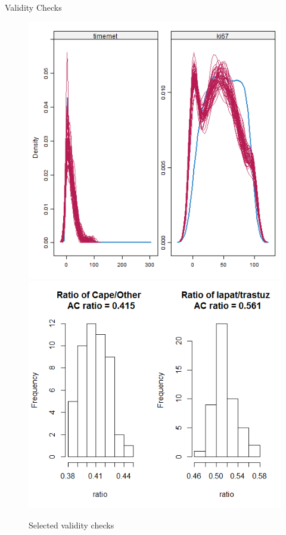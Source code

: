 \begin{frame}{Validity Checks}
   \begin{figure}[h!]
  \centering
\includegraphics[width=.5\textwidth]{cont_densplot}%
\includegraphics[width=.5\textwidth]{cape_lapat_ratio} 
  \caption{Selected validity checks}
\label{fig:valid}
\end{figure}
\end{frame}

